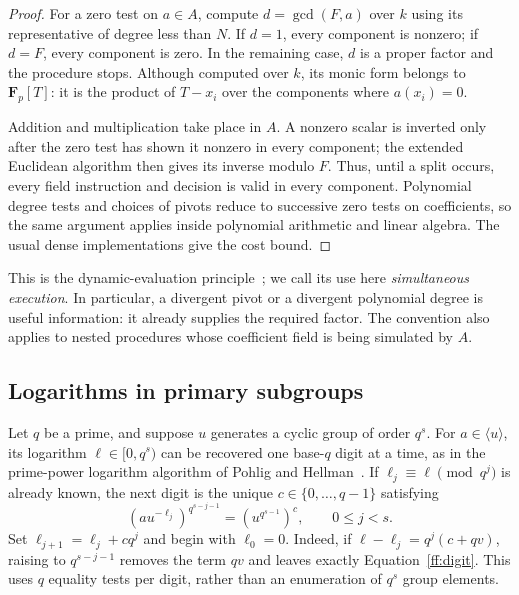 \begin{proof}
For a zero test on $a\in A$, compute $d=\gcd(F,a)$ over $k$ using its
representative of degree less than $N$.  If $d=1$, every component is nonzero;
if $d=F$, every component is zero.  In the remaining case, $d$ is a proper
factor and the procedure stops.  Although computed over $k$, its monic form
belongs to $\mathbf F_p[T]$: it is the product of $T-x_i$ over the components
where $a(x_i)=0$.

Addition and multiplication take place in $A$.  A nonzero scalar is inverted
only after the zero test has shown it nonzero in every component; the extended
Euclidean algorithm then gives its inverse modulo $F$.  Thus, until a split
occurs, every field instruction and decision is valid in every component.
Polynomial degree tests and choices of pivots reduce to successive zero tests
on coefficients, so the same argument applies inside polynomial arithmetic
and linear algebra.  The usual dense implementations give the cost bound.
\end{proof}

This is the dynamic-evaluation principle~\cite{DellaDoraDicrescenzoDuval85};
we call its use here \emph{simultaneous execution}.  In particular, a
divergent pivot or a divergent polynomial degree is useful information: it
already supplies the required factor.  The convention also applies to nested
procedures whose coefficient field is being simulated by $A$.

\subsection{Logarithms in primary subgroups}

Let $q$ be a prime, and suppose $u$ generates a cyclic group of order $q^s$.
For $a\in\langle u\rangle$, its logarithm $\ell\in[0,q^s)$ can be recovered
one base-$q$ digit at a time, as in the prime-power logarithm algorithm of
Pohlig and Hellman~\cite{PohligHellman78}.  If $\ell_j\equiv\ell\pmod{q^j}$ is already
known, the next digit is the unique $c\in\{0,\ldots,q-1\}$ satisfying
\begin{equation}
 (au^{-\ell_j})^{q^{s-j-1}}
   =(u^{q^{s-1}})^c,
 \qquad 0\le j<s.
 \label{ff:digit}
\end{equation}
Set $\ell_{j+1}=\ell_j+cq^j$ and begin with $\ell_0=0$.
Indeed, if $\ell-\ell_j=q^j(c+qv)$, raising to $q^{s-j-1}$ removes the term
$qv$ and leaves exactly Equation~\eqref{ff:digit}.  This uses $q$ equality
tests per digit, rather than an enumeration of $q^s$ group elements.

